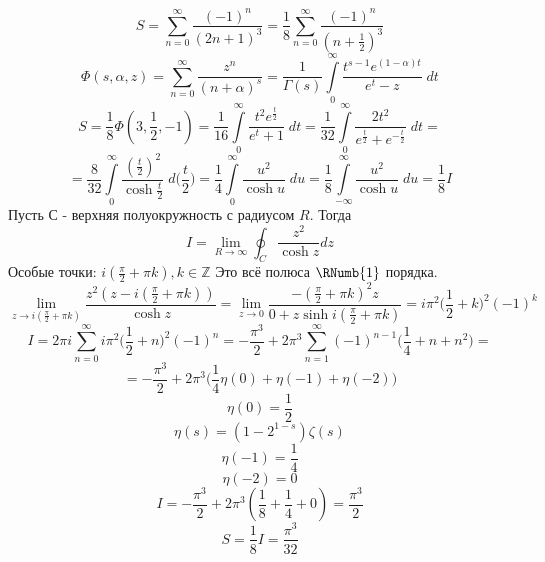 


	$$S = \sum_{n= 0}^{\infty} \frac{(-1)^n}{(2n+1)^3} = \frac{1}{8} \sum_{n= 0}^{\infty} \frac{(-1)^n}{(n+\frac{1}{2})^3}$$
	$$\Phi(s, \alpha, z) = \sum_{n= 0}^{\infty} \frac{z^n}{(n+\alpha)^s} = \frac{1}{\Gamma(s)} \int \limits_0^{\infty} \frac{t^{s-1} e^{(1-\alpha)t}}{e^t-z} \; dt$$
	$$S =\frac{1}{8} \Phi(3,\frac{1}{2}, -1) = \frac{1}{16} \int \limits_0^{\infty} \frac{t^{2} e^{\frac{t}{2}}}{e^t+1} \; dt  =\frac{1}{32} \int \limits_0^{\infty} \frac{2 t^{2}}{e^{\frac{t}{2}}+e^{-\frac{t}{2}}} \; dt = $$
	$$=\frac{8}{32} \int \limits_0^{\infty} \frac{ (\frac{t}{2})^{2}}{\cosh \frac{t}{2}} \; d\Big(\frac{t}{2}\Big) = \frac{1}{4} \int \limits_0^{\infty} \frac{ u^{2}}{\cosh u} \; du =  \frac{1}{8} \int \limits_{-\infty}^{\infty} \frac{ u^{2}}{\cosh u} \; du = \frac{1}{8} I$$
	Пусть С - верхняя полуокружность с радиусом $R$. Тогда
	$$I= \lim_{R \to \infty}\oint_C \frac{ z^{2}}{\cosh z} dz $$
	Особые точки: $i(\frac{\pi}{2}+\pi k) , k \in \mathbb{Z}$
	\newline
	Это всё полюса $\RNumb{1}$ порядка.
	$$\lim_{z \to i(\frac{\pi}{2}+\pi k)} \frac{ z^{2} (z-i(\frac{\pi}{2}+\pi k))}{\cosh z} = \lim_{z \to 0} \frac{-(\frac{\pi}{2}+\pi k)^{2} z }{0+z\sinh i(\frac{\pi}{2}+\pi k)} = i \pi^2 \Big(\frac{1}{2}+k\Big)^2 (-1)^k$$
	$$I = 2\pi i \sum_{n= 0}^{\infty} i \pi^2 \Big(\frac{1}{2}+n\Big)^2 (-1)^n = -\frac{\pi^3}{2}+2\pi^3 \sum_{n = 1}^{\infty} (-1)^{n-1} \Big(\frac{1}{4}+n+n^2\Big) =$$
	$$= -\frac{\pi^3}{2}+2\pi^3 \Big(\frac{1}{4} \eta(0)+\eta(-1)+\eta(-2)\Big) $$
	$$\eta(0) = \frac{1}{2}$$
	$$\eta(s) = (1-2^{1-s})\zeta(s)$$
	$$\eta(-1) = \frac{1}{4}$$
	$$\eta(-2) = 0$$
	$$I = -\frac{\pi^3}{2}+2\pi^3(\frac{1}{8}+ \frac{1}{4}+0) = \frac{\pi^3}{2}$$
	$$S = \frac{1}{8} I = \frac{\pi^3}{32}$$
	
